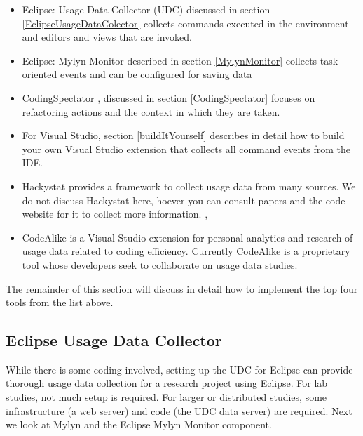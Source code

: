 \begin{itemize}

	\item Eclipse: Usage Data Collector (UDC) discussed in section \ref{EclipseUsageDataColector} collects commands executed in the environment and editors and views that are invoked.
	
	\item Eclipse: Mylyn Monitor described in section \ref{MylynMonitor} collects task oriented events and can be configured for saving data
	
	\item CodingSpectator %
, discussed in section \ref{CodingSpectator} focuses on refactoring actions and the context in which they are taken.
	
	\item For Visual Studio, section \ref{buildItYourself} describes in detail how to build your own Visual Studio extension that collects all command events from the IDE.
	
	\item Hackystat provides a framework to collect usage data from many sources.  We do not discuss Hackystat here, hoever you can consult papers and the code website for it to collect more information. \cite{V:johnson2003beyond}, %
	
	\item CodeAlike is a Visual Studio extension for personal analytics and research of usage data related to coding efficiency.  Currently CodeAlike is a proprietary tool whose developers seek to collaborate on usage data studies.

\end{itemize}


The remainder of this section will discuss in detail how to implement the top four tools from the list above.  

\subsection{Eclipse Usage Data Collector}
\label{EclipseUsageDataCollector}


While there is some coding involved, setting up the UDC for Eclipse can provide thorough usage data collection for a research project using Eclipse.   For lab studies, not much setup is required.  For larger or distributed studies, some infrastructure (a web server) and code (the UDC data server) are required.  Next we look at Mylyn and the Eclipse Mylyn Monitor component.

